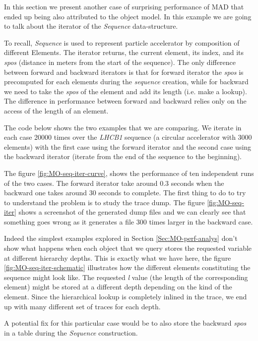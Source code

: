 
In this section we present another case of surprising performance of MAD that
ended up being also attributed to the object model. In this example we are going
to talk about the iterator of the \emph{Sequence} data-structure.

To recall,
\emph{Sequence} is used to represent particle accelerator by composition of
different Elements. The iterator returns, the current element, its index, and its \emph{spos}
(distance in meters from the start of the sequence). The
only difference between forward and backward iterators is that for forward iterator
the \emph{spos} is precomputed for each elements during the \emph{sequence} creation, while for
backward we need to take the \emph{spos} of the element and add its length (i.e. make a lookup).
The difference in performance between forward and backward relies only on the
access of the length of an element.

The code below shows the two examples that we are comparing. We iterate in each
case 20000 times over the \emph{LHCB1} sequence (a circular accelerator with 3000 elements) with
the first case using the forward iterator and the second case using the backward
iterator (iterate from the end of the sequence to the beginning).

The figure \ref{fig:MO-seq-iter-curve}, shows the performance of ten independent
runs of the two cases. The forward iterator take around 0.3 seconds when the
backward one takes around 30 seconds to complete. The first thing to do
to try to understand the problem is to study the trace dump. The figure \ref{fig:MO-seq-iter}
shows a screenshot of the generated dump files and we can clearly see that
something goes wrong as it generates a file 300 times larger in the backward case.

Indeed the simplest examples explored in Section \ref{Sec:MO-perf-analys} don't
show what happens when each object that we query stores the requested variable at
different hierarchy depths. This is exactly what we have here, the figure
\ref{fig:MO-seq-iter-schematic} illustrates how the different elements
constituting the sequence might look like. The requested \emph{l} value (the length
of the corresponding element) might be stored at a different depth depending on
the kind of the element. Since the hierarchical lookup is completely inlined
in the trace, we end up with many different set of traces for each
depth.

A potential fix for this particular case would be to also store the
backward \emph{spos} in a table during the \emph{Sequence} construction.

